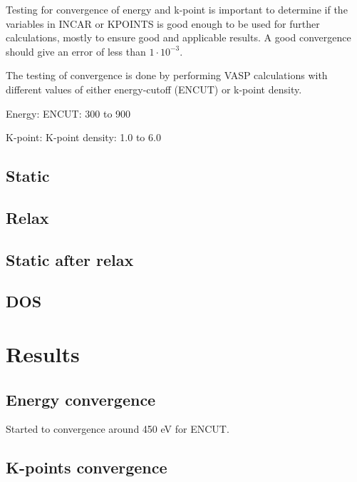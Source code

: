 \documentclass{article}
\begin{document}
    Testing for convergence of energy and k-point is important to determine if the variables in INCAR or KPOINTS is good enough to be used for further calculations, mostly to ensure good and applicable results. A good convergence should give an error of less than $1\cdot 10^{-3}$.

    The testing of convergence is done by performing VASP calculations with different values of either energy-cutoff (ENCUT) or k-point density.

    Energy: ENCUT: 300 to 900

    K-point: K-point density: 1.0 to 6.0


  \subsection{Static}



  \subsection{Relax}



  \subsection{Static after relax}



  \subsection{DOS}











\vspace{1cm}

\section{Results}   \label{sec:Results}

  \subsection{Energy convergence}

    Started to convergence around 450 eV for ENCUT.

  \subsection{K-points convergence}
\end{document}
